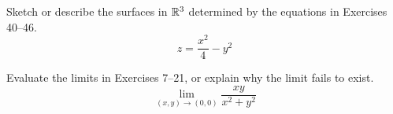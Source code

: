 \documentclass[11pt,letterpaper,boxed]{pset}
\begin{document}
    
    \begin{problem}[2.1 \#40]
    Sketch or describe the surfaces in $\mathbb{R}^3$ determined by the equations in Exercises 40–46.
    \[z = \frac{x^2}{4} - y^2\]
    \end{problem}
    \newpage
    
    
    \begin{problem}[2.2 \#14]
    Evaluate the limits in Exercises 7–21, or explain why the limit fails to exist.
    \[\lim_{(x,y)\to (0,0)} \frac{xy}{x^2+y^2}\]
    \end{problem}
    \newpage
    
\end{document}
